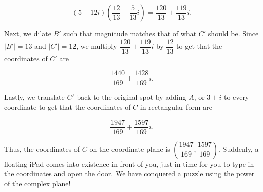 \documentclass{article}
\begin{document}
$$(5+12i)\left(\dfrac{12}{13} - \dfrac{5}{13}i\right) = \dfrac{120}{13} + \dfrac{119}{13}i.$$

Next, we dilate $B'$ such that magnitude matches that of what $C'$ should be. Since $|B'| = 13$ and $|C'| = 12$, we multiply $\dfrac{120}{13} + \dfrac{119}{13}i$ by $\dfrac{12}{13}$ to get that the coordinates of $C'$ are 

$$\dfrac{1440}{169} + \dfrac{1428}{169}i.$$

Lastly, we translate $C'$ back to the original spot by adding $A$, or $3+i$ to every coordinate to get that the coordinates of $C$ in rectangular form are

$$\dfrac{1947}{169} + \dfrac{1597}{169}i.$$

Thus, the coordinates of $C$ on the coordinate plane is $\left(\dfrac{1947}{169}, \dfrac{1597}{169}\right)$. Suddenly, a floating iPad comes into existence in front of you, just in time for you to type in the coordinates and open the door. We have conquered a puzzle using the power of the complex plane!
\end{document}
